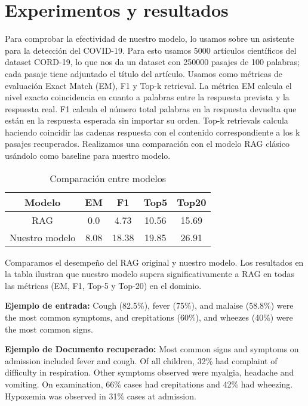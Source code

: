 \documentclass{article}
\begin{document}
\section{Experimentos y resultados}
Para comprobar la efectividad de nuestro modelo, lo usamos sobre un asistente para la detección del COVID-19. Para esto usamos 5000 artículos científicos del dataset CORD-19, lo que nos da un dataset con 250000 pasajes de 100 palabras; cada pasaje tiene adjuntado el título del artículo.
Usamos como métricas de evaluación Exact Match (EM), F1 y Top-k retrieval. La métrica EM calcula el nivel exacto coincidencia en cuanto a palabras entre la respuesta prevista y la respuesta real. F1 calcula el número total palabras en la respuesta devuelta que están en la respuesta esperada sin importar su orden. Top-k retrievals calcula haciendo coincidir las cadenas respuesta con el contenido correspondiente a los k pasajes recuperados.
Realizamos una comparación con el modelo RAG clásico usándolo como baseline para nuestro modelo.
\begin{table}[h]
    \centering
    \begin{tabular}{|c|c|c|c|c|}
        \hline
        Modelo & EM & F1 & Top5 & Top20 \\
        \hline
        RAG & 0.0 & 4.73 & 10.56 & 15.69 \\
        Nuestro modelo & 8.08 & 18.38 & 19.85 & 26.91 \\
        \hline
    \end{tabular}
    \caption{Comparación entre modelos}
    \label{tab:comparacion_modelos}
\end{table}

Comparamos el desempeño del RAG original y nuestro modelo. Los resultados en la tabla ilustran que nuestro modelo supera significativamente a RAG en todas las métricas (EM, F1, Top-5 y Top-20) en el dominio.



\textbf{Ejemplo de entrada:} Cough (82.5\%), fever (75\%), and malaise (58.8\%) were the most common symptoms, and crepitations (60\%), and wheezes (40\%) were the most common signs.

\vspace{1em} %

\textbf{Ejemplo de Documento recuperado:} Most common signs and symptoms on admission included fever and cough. Of all children, 32\% had complaint of difficulty in respiration. Other symptoms observed were myalgia, headache and vomiting. On examination, 66\% cases had crepitations and 42\% had wheezing. Hypoxemia was observed in 31\% cases at admission.
\end{document}
